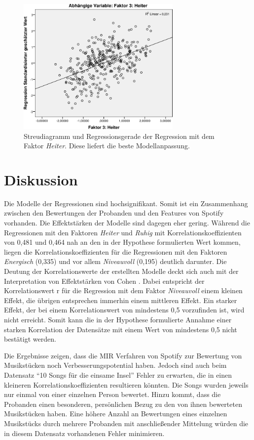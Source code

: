 \begin{figure}[hbt]
    \begin{center}
        \includegraphics[width=8cm]{images/StreudiagrammFak3.pdf}
    \end{center}
    \caption{Streudiagramm und Regressionsgerade der Regression mit dem Faktor \textit{Heiter}. Diese liefert die beste Modellanpassung.}
    \label{fig:Faktor3}
\end{figure}

\section*{Diskussion}
\label{sec:Diskussion}


Die Modelle der Regressionen sind hochsignifikant.
Somit ist ein Zusammenhang zwischen den Bewertungen der Probanden und den Features von Spotify vorhanden.
Die Effektstärken der Modelle sind dagegen eher gering. 
Während die Regressionen mit den Faktoren \textit{Heiter} und \textit{Ruhig} mit Korrelationskoeffizienten von 0,481 und 0,464 nah an den in der Hypothese formulierten Wert kommen, liegen die Korrelationskoeffizienten für die Regressionen mit den Faktoren  \textit{Energisch} (0,335) und vor allem \textit{Niveauvoll} (0,195) deutlich darunter.
Die Deutung der Korrelationswerte der erstellten Modelle deckt sich auch mit der Interpretation von Effektstärken von Cohen \cite{cohen1988}.
Dabei entspricht der Korrelationswert r für die Regression mit dem Faktor \textit{Niveauvoll} einem kleinen Effekt, die übrigen entsprechen immerhin einem mittleren Effekt.
Ein starker Effekt, der bei einem Korrelationswert von mindestens 0,5 vorzufinden ist, wird nicht erreicht.
Somit kann die in der Hypothese formulierte Annahme einer starken Korrelation der Datensätze mit einem Wert von mindestens 0,5 nicht bestätigt werden. 

Die Ergebnisse zeigen, dass die MIR Verfahren von Spotify zur Bewertung von Musikstücken noch Verbesserungspotential haben.
Jedoch sind auch beim Datensatz "`10 Songs für die einsame Insel"' Fehler zu erwarten, die in einen kleineren Korrelationskoeffizienten resultieren könnten.
Die Songs wurden jeweils nur einmal von einer einzelnen Person bewertet.
Hinzu kommt, dass die Probanden einen besonderen, persönlichen Bezug zu den von ihnen bewerteten Musikstücken haben.
Eine höhere Anzahl an Bewertungen eines einzelnen Musikstücks durch mehrere Probanden mit anschließender Mittelung würden die in diesem Datensatz vorhandenen Fehler minimieren.

